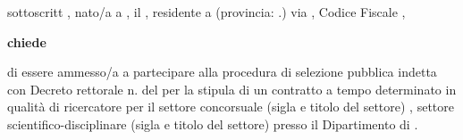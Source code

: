 	\myTextField[.5cm]{} sottoscritt\myTextField[.5cm]{} \myTextField[4cm]{},
	nato/a a \myTextField{}, il \myTextField{}, residente a \myTextField{}
	(provincia: \myTextField{}.) via \myTextField{}, Codice Fiscale
	\myTextField[4cm]{},
	\begin{center}
		\textbf{chiede}
	\end{center}
	di essere ammesso/a a partecipare alla procedura di selezione pubblica indetta
	con Decreto rettorale n. \myTextField{} del \myTextField{} per la stipula di un
	contratto a tempo determinato in qualità di ricercatore per il settore concorsuale
	(sigla e titolo del settore) \myTextField{}, settore scientifico-disciplinare
	(sigla e titolo  del settore) \myTextField{} presso il Dipartimento di \myTextField[4cm]{}.
